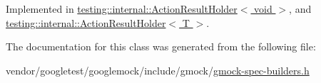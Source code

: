 Implemented in \hyperlink{classtesting_1_1internal_1_1ActionResultHolder_3_01void_01_4_a6729c4fe6c33485ece4fbcfea8806e49}{testing\+::internal\+::\+Action\+Result\+Holder$<$ void $>$}, and \hyperlink{classtesting_1_1internal_1_1ActionResultHolder_a70989192d3ed669c059a7e29c4a7b9fc}{testing\+::internal\+::\+Action\+Result\+Holder$<$ T $>$}.



The documentation for this class was generated from the following file\+:\begin{DoxyCompactItemize}
\item 
vendor/googletest/googlemock/include/gmock/\hyperlink{gmock-spec-builders_8h}{gmock-\/spec-\/builders.\+h}\end{DoxyCompactItemize}
